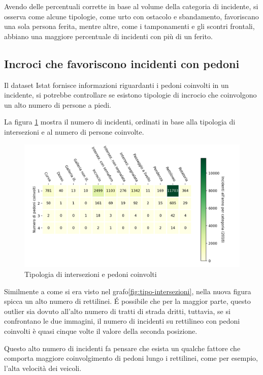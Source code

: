 \documentclass[a4paper]{report}
\begin{document}
Avendo delle percentuali corrette in base al volume della categoria di incidente, si 
osserva come alcune tipologie, come urto con ostacolo e sbandamento, favoriscano una sola persona ferita, 
mentre altre, come i tamponamenti e gli scontri frontali, abbiano una maggiore percentuale di 
incidenti con più di un ferito.

\subsection{Incroci che favoriscono incidenti con pedoni}

Il dataset Istat fornisce informazioni riguardanti i pedoni coinvolti in un incidente, 
si potrebbe controllare se esistono tipologie di incrocio che coinvolgono un alto numero di 
persone a piedi.

La figura \ref{fig:pedoni-intersezioni} mostra il numero di incidenti, 
ordinati in base alla tipologia di intersezioni e al numero di persone coinvolte.

\begin{figure}
    \includegraphics[width=\linewidth]{../src/incidenti/incidenti_senza_coords/pedoni/pedoni_incroci.png}
    \caption{Tipologia di intersezioni e pedoni coinvolti}
    \label{fig:pedoni-intersezioni}
\end{figure}

Similmente a come si era visto nel grafo\ref{fig:tipo-intersezioni}, nella nuova figura spicca 
un alto numero di rettilinei.
\'E possibile che per la maggior parte, questo outlier sia dovuto all'alto numero di tratti 
di strada dritti, tuttavia, se si confrontano le due immagini, il numero di incidenti su 
rettilineo con pedoni coinvolti è quasi cinque volte il valore della seconda posizione.

Questo alto numero di incidenti fa pensare che esista un qualche fattore che comporta 
maggiore coinvolgimento di pedoni lungo i rettilinei, come per esempio, l'alta velocità 
dei veicoli.
\end{document}
